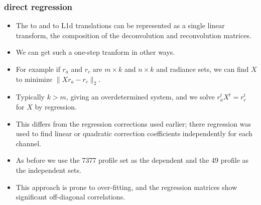 \documentclass[10pt]{beamer}
\begin{document}
\begin{frame}
\frametitle{direct regression}
\begin{itemize}

  \item The {\airs} to {\cris} and {\airs} to L1d translations can
    be represented as a single linear transform, the composition of
    the deconvolution and reconvolution matrices.  

  \item We can get such a one-step tranform in other ways.

  \item For example if $r_a$ and $r_c$ are $m \times k$ and $n
    \times k$ {\airs} and {\cris} radiance sets, we can find $X$ to
    minimize $\|X r_a - r_c\|_2$.  

  \item Typically $k > m$, giving an overdetermined system, and we
    solve $r_a^t X^t = r_c^t$ for $X$ by regression.

  \item This differs from the regression corrections used earlier;
    there regression was used to find linear or quadratic correction
    coefficients independently for each channel.

  \item As before we use the 7377 profile set as the dependent and
    the 49 profile as the independent sets.

  \item This approach is prone to over-fitting, and the regression
    matrices show significant off-diagonal correlations.

\end{itemize}
\end{frame}
\end{document}
